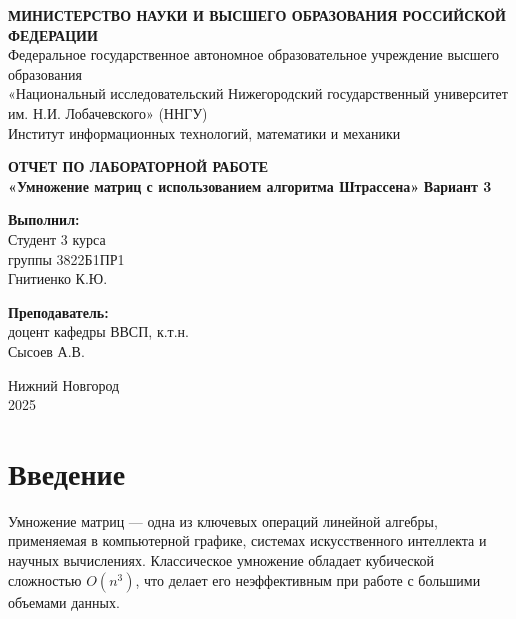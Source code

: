 \documentclass[14pt,a4paper]{extarticle}
\begin{document}
\begin{titlepage}
\begin{center}

\onehalfspacing

\textbf{МИНИСТЕРСТВО НАУКИ И ВЫСШЕГО ОБРАЗОВАНИЯ РОССИЙСКОЙ ФЕДЕРАЦИИ} \\
Федеральное государственное автономное образовательное учреждение высшего образования \\
«Национальный исследовательский Нижегородский государственный университет им. Н.И. Лобачевского» (ННГУ) \\
Институт информационных технологий, математики и механики

\vspace{4cm}

\textbf{ОТЧЕТ ПО ЛАБОРАТОРНОЙ РАБОТЕ} \\
\textbf{«Умножение матриц с использованием алгоритма Штрассена»}
\textbf{Вариант 3}

\vspace{4cm}

\begin{flushright}
\textbf{Выполнил:} \\
Студент 3 курса \\
группы 3822Б1ПР1 \\
Гнитиенко К.Ю.

\vspace{1cm}

\textbf{Преподаватель:} \\
доцент кафедры ВВСП, к.т.н. \\
Сысоев А.В.
\end{flushright}

\vspace{1cm}

\begin{center}
Нижний Новгород\\
2025
\end{center}

\end{center}
\end{titlepage}

\tableofcontents
\newpage

\section{Введение}

Умножение матриц — одна из ключевых операций линейной алгебры, применяемая в компьютерной графике, системах искусственного интеллекта и научных вычислениях. Классическое умножение обладает кубической сложностью $O(n^3)$, что делает его неэффективным при работе с большими объемами данных.
\end{document}
